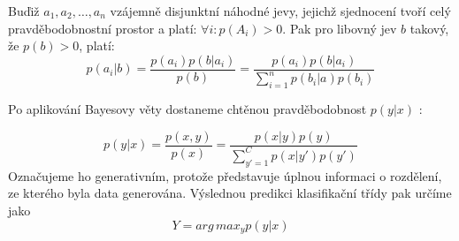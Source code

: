    \begin{definition}
        Buďiž $a_1, a_2, \hdots, a_n$ vzájemně disjunktní náhodné jevy, jejichž sjednocení tvoří celý pravděbodobnostní prostor a platí: $\forall i : p(A_i) > 0 $. Pak pro libovný jev $b$ takový, že $p(b) > 0$, platí: 
        $$p(a_i|b) = \frac{p(a_i)p(b|a_i)}{p(b)} = \frac{p(a_i)p(b|a_i)}{\sum_{i=1}^{n}p(b_i|a)p(b_i)}$$
        \end{definition}

Po aplikování Bayesovy věty dostaneme chtěnou pravděbodobnost $p(y|x)$ \cite{naiveBayes}:

$$p(y|x) = \frac{p(x,y)}{p(x)} = \frac{p(x|y)p(y)}{\sum_{y' = 1}^{C}p(x|y')p(y')}$$
Označujeme ho generativním, protože představuje úplnou informaci o rozdělení, ze kterého byla data generována. Výslednou predikci klasifikační třídy pak určíme jako 
$$ Y = arg\,max_y p(y|x)$$

